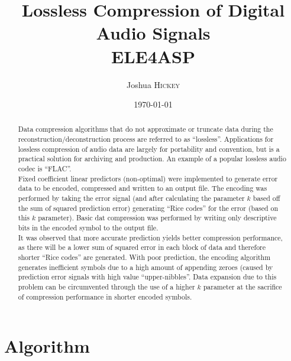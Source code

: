 \documentclass{article}
\title{Lossless Compression of Digital Audio Signals \\ ELE4ASP} %
\author{Joshua \textsc{Hickey}} %
\date{\today} %
\begin{document}
\maketitle %



\begin{abstract}

Data compression algorithms that do not approximate or truncate data during the reconstruction/deconstruction process are referred to as ``lossless''. Applications for lossless compression of audio data are largely for portability and convention, but is a practical solution for archiving and production. An example of a popular lossless audio codec is ``FLAC''.\\

Fixed coefficient linear predictors (non-optimal) were implemented to generate error data to be encoded, compressed and written to an output file. The encoding was performed by taking the error signal (and after calculating the parameter $k$ based off the sum of squared prediction error) generating ``Rice codes'' for the error (based on this $k$ parameter). Basic dat compression was performed by writing only descriptive bits in the encoded symbol to the output file.\\

It was observed that more accurate prediction yields better compression performance, as there will be a lower sum of squared error in each block of data and therefore shorter ``Rice codes'' are generated. With poor prediction, the encoding algorithm generates inefficient symbols due to a high amount of appending zeroes (caused by prediction error signals with high value ``upper-nibbles''. Data expansion due to this problem can be circumvented through the use of a higher $k$ parameter at the sacrifice of compression performance in shorter encoded symbols.\\

\end{abstract}

\section*{Algorithm}
\end{document}
